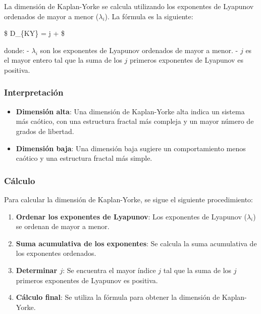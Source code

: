 \documentclass[11pt]{article}
\providecommand{\tightlist}{%
      \setlength{\itemsep}{0pt}\setlength{\parskip}{0pt}}
\begin{document}
La dimensión de Kaplan-Yorke se calcula utilizando los exponentes de
Lyapunov ordenados de mayor a menor (\(\lambda_i\)). La fórmula es la
siguiente:

\$ D\_\{KY\} = j +  \$

donde: - \(\lambda_i\) son los exponentes de Lyapunov ordenados de mayor
a menor. - \(j\) es el mayor entero tal que la suma de los \(j\)
primeros exponentes de Lyapunov es positiva.

\hypertarget{interpretaciuxf3n-1}{%
\subsubsection{Interpretación}\label{interpretaciuxf3n-1}}

\begin{itemize}
\tightlist
\item
  \textbf{Dimensión alta}: Una dimensión de Kaplan-Yorke alta indica un
  sistema más caótico, con una estructura fractal más compleja y un
  mayor número de grados de libertad.
\item
  \textbf{Dimensión baja}: Una dimensión baja sugiere un comportamiento
  menos caótico y una estructura fractal más simple.
\end{itemize}

\hypertarget{cuxe1lculo-1}{%
\subsubsection{Cálculo}\label{cuxe1lculo-1}}

Para calcular la dimensión de Kaplan-Yorke, se sigue el siguiente
procedimiento:

\begin{enumerate}
\def\labelenumi{\arabic{enumi}.}
\tightlist
\item
  \textbf{Ordenar los exponentes de Lyapunov}: Los exponentes de
  Lyapunov (\(\lambda_i\)) se ordenan de mayor a menor.
\item
  \textbf{Suma acumulativa de los exponentes}: Se calcula la suma
  acumulativa de los exponentes ordenados.
\item
  \textbf{Determinar \(j\)}: Se encuentra el mayor índice \(j\) tal que
  la suma de los \(j\) primeros exponentes de Lyapunov es positiva.
\item
  \textbf{Cálculo final}: Se utiliza la fórmula para obtener la
  dimensión de Kaplan-Yorke.
\end{enumerate}
\end{document}
